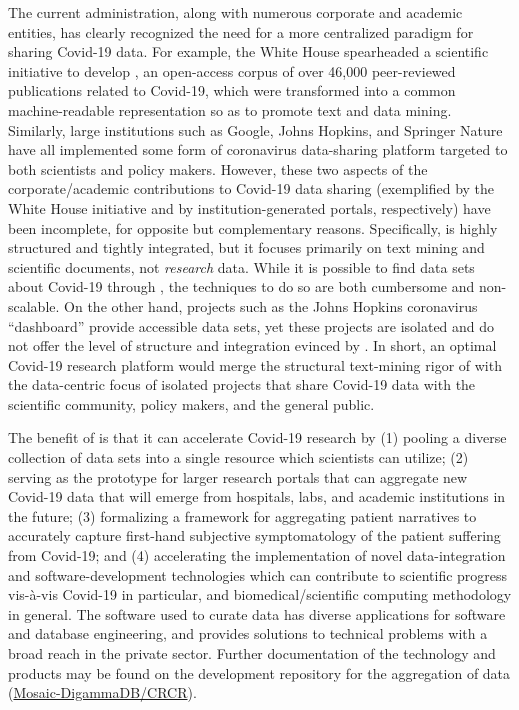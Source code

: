 \documentclass[11pt,letterpaper]{article}
\newcommand{\visavis}{vis-\`a-vis}
\newcommand{\textscc}[1]{{\color{orr!35!black}{{%
						\fontfamily{Cabin-TLF}\fontseries{b}\selectfont{\textsc{\scriptsize{#1}}}}}}}
\newcommand{\AcronymText}[1]{{\textscc{#1}}}
\newcommand{\CRtwo}{{\resizebox{!}{7pt}{\AcronymText{CR2}}}}
\newcommand{\Cnineteen}{\resizebox{!}{7pt}{\AcronymText{CORD-19}}}
\newcommand{\lCnineteen}{\resizebox{!}{7.5pt}{\AcronymText{CORD-19}}}
\newcommand{\p}[1]{

\vspace{.7em}#1}
\newcommand{\q}[1]{{\fontfamily{qcr}\selectfont ``}#1{\fontfamily{qcr}\selectfont ''}}
\begin{document}
{\p{The current administration, along with numerous corporate and academic 
entities, has clearly recognized the need for a more 
centralized paradigm for sharing Covid-19 data.  For example, 
the White House spearheaded a scientific initiative to 
develop \Cnineteen{}, an open-access corpus of over 46,000 
peer-reviewed publications related to Covid-19, which 
were transformed into a common machine-readable representation 
so as to promote text and data mining.  Similarly, 
large institutions such as Google, Johns Hopkins, and 
Springer Nature have all implemented some form of coronavirus 
data-sharing platform targeted to both scientists and 
policy makers.  However, these two aspects of the 
corporate/academic contributions to Covid-19 data sharing 
(exemplified by the \Cnineteen{} White House initiative and by 
institution-generated portals, respectively) 
have been incomplete, for opposite but complementary 
reasons.  Specifically, \lCnineteen{} is highly structured and tightly 
integrated, but it focuses primarily on text mining and 
scientific documents, not \textit{research} data.  
While it is possible to find data 
sets about Covid-19 through \Cnineteen{}, the 
techniques to do so are both cumbersome and non-scalable.  
On the other hand, projects such as the Johns Hopkins coronavirus 
\q{dashboard} provide accessible data sets, yet these 
projects are isolated and do not offer the level of 
structure and integration evinced by \Cnineteen{}.  In 
short, an optimal Covid-19 research platform 
would merge the structural text-mining rigor of 
\Cnineteen{} with the data-centric focus of  
isolated projects that share Covid-19 data 
with the scientific community, policy makers, 
and the general public.}

\p{The benefit of \CRtwo{} 
is that it can accelerate Covid-19 research by 
(1) pooling a diverse collection of data sets into a 
single resource which scientists can utilize; 
(2) serving as the prototype for larger research 
portals that can aggregate new Covid-19 data 
that will emerge from hospitals, labs, and 
academic institutions in the future; (3) formalizing 
a framework for aggregating patient narratives 
to accurately capture first-hand subjective symptomatology of 
the patient suffering from Covid-19; and 
(4) accelerating the implementation of novel 
data-integration and software-development 
technologies which can contribute to scientific 
progress \visavis{} Covid-19 
in particular, and biomedical/scientific computing 
methodology in general.
The software used to curate \CRtwo{} data has 
diverse applications for software and database engineering, 
and provides solutions to technical problems with a 
broad reach in the private sector.  Further 
documentation of the \CRtwo{} technology and 
products may be found on the development repository 
for the aggregation of \CRtwo{} data 
(\href{https://github.com/Mosaic-DigammaDB/CRCR}{Mosaic-DigammaDB/CRCR}).}

}
\end{document}
